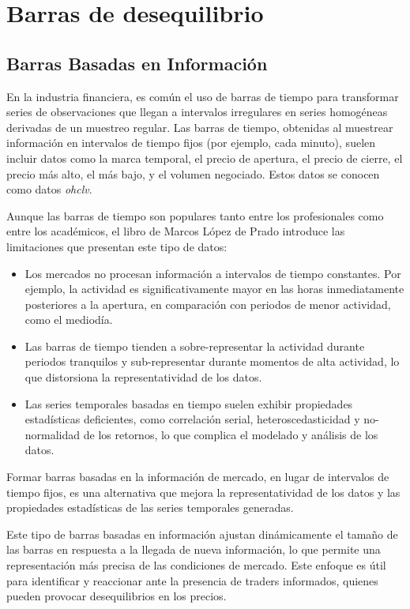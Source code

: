 \documentclass[a4paper,12pt, twoside]{report}
\begin{document}
\chapter{Barras de desequilibrio}

\section{Barras Basadas en Información}

En la industria financiera, es común el uso de barras de tiempo para transformar 
series de observaciones que llegan a intervalos irregulares en series homogéneas 
derivadas de un muestreo regular. Las barras de tiempo, obtenidas al muestrear 
información en intervalos de tiempo fijos (por ejemplo, cada minuto), suelen incluir 
datos como la marca temporal, el precio de apertura, el precio de cierre, el precio 
más alto, el más bajo, y el volumen negociado. Estos datos se conocen como datos \textit{ohclv}.

Aunque las barras de tiempo son populares tanto entre los profesionales como entre los académicos, 
el libro de Marcos López de Prado introduce las limitaciones que presentan este tipo de datos:

\begin{itemize}
    \item Los mercados no procesan información a intervalos de tiempo constantes. Por ejemplo, la 
    actividad es significativamente mayor en las horas inmediatamente posteriores a la apertura, 
    en comparación con periodos de menor actividad, como el mediodía.
    \item Las barras de tiempo tienden a sobre-representar la actividad durante periodos tranquilos 
    y sub-representar durante momentos de alta actividad, lo que distorsiona la representatividad de los datos.
    \item Las series temporales basadas en tiempo suelen exhibir propiedades estadísticas deficientes, 
    como correlación serial, heteroscedasticidad y no-normalidad de los retornos, lo que complica el 
    modelado y análisis de los datos.
\end{itemize}

Formar barras basadas en la información de mercado, en lugar de intervalos de tiempo fijos, 
es una alternativa que mejora la representatividad de los datos y las propiedades estadísticas 
de las series temporales generadas. 

Este tipo de barras basadas en información ajustan dinámicamente el tamaño de las barras
en respuesta a la llegada de nueva información, lo que permite una representación
más precisa de las condiciones de mercado. Este enfoque es útil para identificar y reaccionar 
ante la presencia de traders
informados, quienes pueden provocar desequilibrios en los precios.
\end{document}
